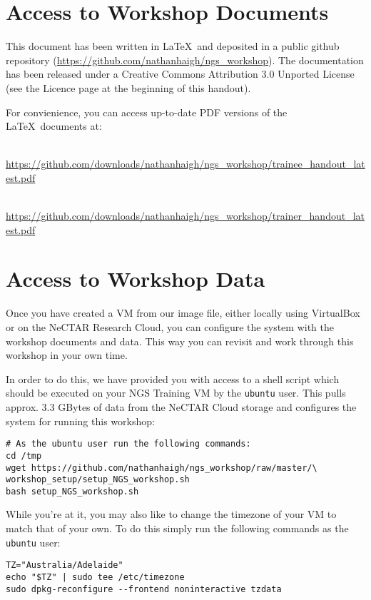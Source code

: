 \section{Access to Workshop Documents}

This document has been written in \LaTeX\ and deposited in a public github
repository (\url{https://github.com/nathanhaigh/ngs_workshop}). The
documentation has been released under a Creative Commons Attribution 3.0
Unported License (see the Licence page at the beginning of this handout).

For convienience, you can access up-to-date PDF versions of the \LaTeX\ documents at:
\begin{description}[style=multiline,labelindent=0cm,align=left,leftmargin=0.5cm]
\item[Trainee Handout]\hfill\\
\url{https://github.com/downloads/nathanhaigh/ngs_workshop/trainee_handout_latest.pdf}
\item[Trainer Handout]\hfill\\
\url{https://github.com/downloads/nathanhaigh/ngs_workshop/trainer_handout_latest.pdf}
\end{description}

\section{Access to Workshop Data}
Once you have created a VM from our image file, either locally using VirtualBox
or on the NeCTAR Research Cloud, you can configure the system with the workshop
documents and data. This way you can revisit and work through this workshop in
your own time.

In order to do this, we have provided you with access to a shell script which
should be executed on your NGS Training VM by the \texttt{ubuntu} user. This pulls
approx. 3.3 GBytes of data from the NeCTAR Cloud storage and configures the system
for running this workshop:

\begin{lstlisting}
# As the ubuntu user run the following commands:
cd /tmp
wget https://github.com/nathanhaigh/ngs_workshop/raw/master/\
workshop_setup/setup_NGS_workshop.sh
bash setup_NGS_workshop.sh
\end{lstlisting}

While you're at it, you may also like to change the timezone of your VM to match
that of your own. To do this simply run the following commands as the
\texttt{ubuntu} user:
\begin{lstlisting}
TZ="Australia/Adelaide"
echo "$TZ" | sudo tee /etc/timezone
sudo dpkg-reconfigure --frontend noninteractive tzdata
\end{lstlisting}

